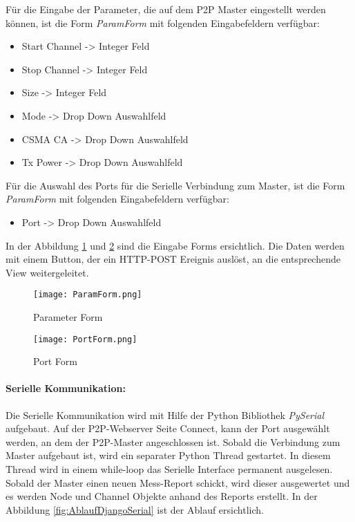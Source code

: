 Für die Eingabe der Parameter, die auf dem P2P Master eingestellt werden können, ist die Form \textit{ParamForm} mit folgenden Eingabefeldern verfügbar:
\begin{itemize}
	\item Start Channel \hspace{5mm} -> Integer Feld
	\item Stop Channel \hspace{6mm} -> Integer Feld
	\item Size \hspace{22.3mm} -> Integer Feld
	\item Mode \hspace{19.5mm} -> Drop Down Auswahlfeld
	\item CSMA CA \hspace{10.5mm} -> Drop Down Auswahlfeld
	\item Tx Power \hspace{13mm} -> Drop Down Auswahlfeld
\end{itemize}

Für die Auswahl des Ports für die Serielle Verbindung zum Master, ist die Form \textit{ParamForm} mit folgenden Eingabefeldern verfügbar:
\begin{itemize}
	\item  Port \hspace{22mm} -> Drop Down Auswahlfeld
\end{itemize}


In der Abbildung \ref{fig:ParamForm} und \ref{fig:PortForm} sind die Eingabe Forms ersichtlich. Die Daten werden mit einem Button, der ein HTTP-POST Ereignis auslöst, an die entsprechende View weitergeleitet.

\begin{figure} [H]
	\centering
	\texttt{[image: ParamForm.png]}
	\caption{Parameter Form}
	\label{fig:ParamForm}
\end{figure}

\begin{figure} [H]
	\centering
	\texttt{[image: PortForm.png]}
	\caption{Port Form}
	\label{fig:PortForm}
\end{figure}


\paragraph{Serielle Kommunikation:}\label{par:SerielleKommunikation}
Die Serielle Kommunikation wird mit Hilfe der Python Bibliothek \textit{PySerial} aufgebaut. Auf der P2P-Webserver Seite Connect, kann der Port ausgewählt werden, an dem der P2P-Master angeschlossen ist. Sobald die Verbindung zum Master aufgebaut ist, wird ein separater Python Thread gestartet. In diesem Thread wird in einem while-loop das Serielle Interface permanent ausgelesen. Sobald der Master einen neuen Mess-Report schickt, wird dieser ausgewertet und es werden Node und Channel Objekte anhand des Reports erstellt. In der Abbildung \ref{fig:AblaufDjangoSerial} ist der Ablauf ersichtlich.


